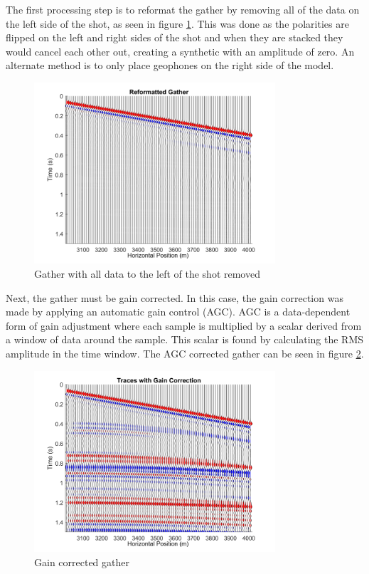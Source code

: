 \documentclass[12pt]{article}
\begin{document}
	The first processing step is to reformat the gather by removing all of the data on the left side of the shot, as seen in figure \ref{fig:FD3RefGather}. This was done as the polarities are flipped on the left and right sides of the shot and when they are stacked they would cancel each other out, creating a synthetic with an amplitude of zero. An alternate method is to only place geophones on the right side of the model.
	
\begin{figure}[!htb]
	\centering
	\includegraphics[width=0.8\textwidth]{Figures/FD3ReformattedGather.png}
	\caption[Finite-difference 3-layer reformatted gather] {Gather with all data to the left of the shot removed}
	\label{fig:FD3RefGather}
\end{figure}
	
	Next, the gather must be gain corrected. In this case, the gain correction was made by applying an automatic gain control (AGC). AGC is a data-dependent form of gain adjustment where each sample is multiplied by a scalar derived from a window of data around the sample. This scalar is found by calculating the RMS amplitude in the time window. The AGC corrected gather can be seen in figure \ref{fig:FD3Gain}.
	
\begin{figure}[!htb]
	\centering
	\includegraphics[width=0.8\textwidth]{Figures/FD3TraceswithGainCorrection.png}
	\caption[Finite-difference 3-layer gain correction]{Gain corrected gather}
	\label{fig:FD3Gain}
\end{figure}
	
\end{document}
